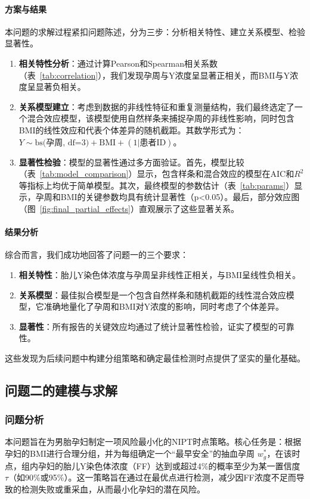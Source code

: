 \documentclass[withoutpreface]{cumcmthesis}
\begin{document}
\paragraph{方案与结果}
本问题的求解过程紧扣问题陈述，分为三步：分析相关特性、建立关系模型、检验显著性。
\begin{enumerate}
    \item \textbf{相关特性分析}：通过计算Pearson和Spearman相关系数（表~\ref{tab:correlation}），我们发现孕周与Y浓度呈显著正相关，而BMI与Y浓度呈显著负相关。
    \item \textbf{关系模型建立}：考虑到数据的非线性特征和重复测量结构，我们最终选定了一个混合效应模型，该模型使用自然样条来捕捉孕周的非线性影响，同时包含BMI的线性效应和代表个体差异的随机截距。其数学形式为：$Y \sim \text{bs(孕周, df=3)} + \text{BMI} + (1|\text{患者ID})$。
    \item \textbf{显著性检验}：模型的显著性通过多方面验证。首先，模型比较（表~\ref{tab:model_comparison}）显示，包含样条和混合效应的模型在AIC和$R^2$等指标上均优于简单模型。其次，最终模型的参数估计（表~\ref{tab:params}）显示，孕周和BMI的关键参数均具有统计显著性（p<0.05）。最后，部分效应图（图~\ref{fig:final_partial_effects}）直观展示了这些显著关系。
\end{enumerate}

\paragraph{结果分析}
综合而言，我们成功地回答了问题一的三个要求：
\begin{enumerate}
    \item \textbf{相关特性}：胎儿Y染色体浓度与孕周呈非线性正相关，与BMI呈线性负相关。
    \item \textbf{关系模型}：最佳拟合模型是一个包含自然样条和随机截距的线性混合效应模型，它准确地量化了孕周和BMI对Y浓度的影响，同时考虑了个体差异。
    \item \textbf{显著性}：所有报告的关键效应均通过了统计显著性检验，证实了模型的可靠性。
\end{enumerate}
这些发现为后续问题中构建分组策略和确定最佳检测时点提供了坚实的量化基础。

\subsection{问题二的建模与求解}
\subsubsection{问题分析}
本问题旨在为男胎孕妇制定一项风险最小化的NIPT时点策略。核心任务是：根据孕妇的BMI进行合理分组，并为每组确定一个“最早安全”的抽血孕周 $w_g^{*}$，在该时点，组内孕妇的胎儿Y染色体浓度（FF）达到或超过4\%的概率至少为某一置信度 $\tau$（如90\%或95\%）。这一策略旨在通过在最优点进行检测，减少因FF浓度不足而导致的检测失败或重采血，从而最小化孕妇的潜在风险。
\end{document}
